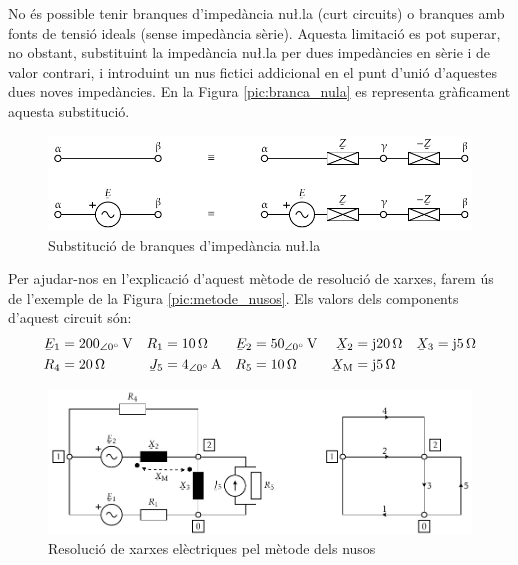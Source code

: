 No \'{e}s possible tenir branques d'imped\`{a}ncia nu{\l.l}a (curt circuits) o
branques amb fonts de tensi\'{o} ideals (sense imped\`{a}ncia s\`{e}rie).
Aquesta limitaci\'{o} es pot superar, no obstant, substituint la
imped\`{a}ncia nu{\l.l}a per dues imped\`{a}ncies en s\`{e}rie i de valor
contrari, i introduint un nus fictici addicional en el punt d'uni\'{o}
d'aquestes dues noves imped\`{a}ncies. En la Figura
\vref{pic:branca_nula}
 es representa gr\`{a}ficament aquesta substituci\'{o}. 
\begin{figure}[htb]
\centering
   \includegraphics{Imatges/Cap-ResXarxElec-Branques-Z0.pdf}
\caption{Substituci\'{o} de branques d'imped\`{a}ncia nu{\l.l}a}
\label{pic:branca_nula}
\end{figure}

Per ajudar-nos en l'explicaci\'{o} d'aquest m\`{e}tode de resoluci\'{o} de xarxes, farem
\'{u}s de l'exemple de la Figura \vref{pic:metode_nusos}. Els valors dels components d'aquest
circuit s\'{o}n:
\begin{align*}
   \cmplx{E}_1 &= 200_{\angle 0\degree}\unit{V} & R_1 &= 10\unit{\ohm} &
   \cmplx{E}_2 &= 50_{\angle 0\degree}\unit{V}  & \cmplx{X}_2 &= \ju 20\unit{\ohm} &
   \cmplx{X}_3 &= \ju 5\unit{\ohm} \\
   R_4 &= 20\unit{\ohm} & \cmplx{J}_5 &= 4_{\angle 0\degree}\unit{A} &
   R_5 &= 10\unit{\ohm} & \cmplx{X}\ped{M} &= \ju 5\unit{\ohm}
\end{align*}

\begin{figure}[htb]
\vspace{-4mm} \centering
    \includegraphics{Imatges/Cap-ResXarxElec-Circuit-Graf.pdf}
   \caption{Resoluci\'{o} de xarxes el\`{e}ctriques pel m\`{e}tode dels nusos} \label{pic:metode_nusos}
\end{figure}

